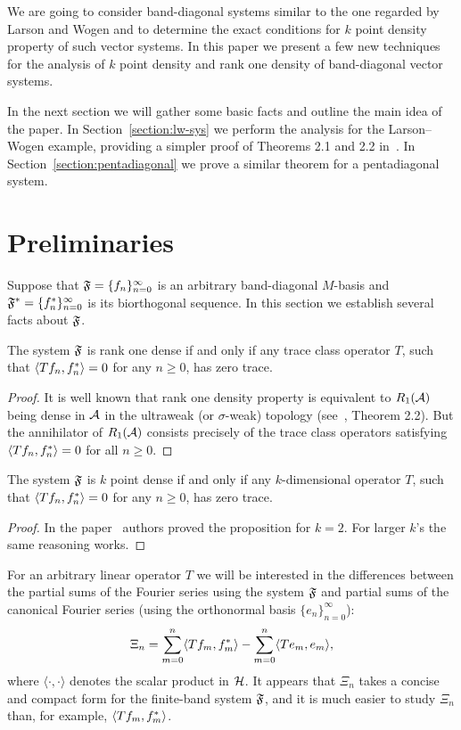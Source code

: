 \documentclass[12pt]{amsart}
\theoremstyle{case}
\begin{document}
    We are going to consider band-diagonal systems similar to the one regarded by Larson and Wogen and to determine the exact conditions
      for $k$ point density property of such vector systems.
    In this paper we present a few new techniques for the analysis of $k$ point density and rank one density of band-diagonal vector systems.

    In the next section we will gather some basic facts and outline the main idea of the paper.
    In Section~\ref{section:lw-sys} we perform the analysis for the Larson--Wogen example, providing a simpler proof of Theorems 2.1 and 2.2 in~\cite{katavolos}.
    In Section~\ref{section:pentadiagonal} we prove a similar theorem for a pentadiagonal system.
\section{Preliminaries}
  \label{sec:preliminaries}
  Suppose that $\fsys=\{f_n\}_{n=0}^\infty$ is an arbitrary band-diagonal $M$-basis and $\fstarsys = \{f^*_n\}_{n=0}^\infty$ is its biorthogonal sequence.
  In this section we establish several facts about $\fsys$.
  \begin{prop}
    The system $\fsys$ is rank one dense if and only if any trace class operator $T$,
      such that $\inner{Tf_n}{f_n^*} = 0$ for any $n \geq 0$, has  zero trace.
  \end{prop}
  \begin{proof}
    It is well known that rank one density property is equivalent to $R_1(\cal{A})$ being dense
      in $\cal{A}$ in the ultraweak (or $\sigma$-weak) topology (see~\cite{katavolos}, Theorem 2.2).
    But the annihilator of $R_1(\cal{A})$ consists precisely of the trace class operators satisfying
      $\inner{Tf_n}{f_n^*} = 0$ for all $n \geq 0$.
  \end{proof}
  \begin{prop}
    The system $\fsys$ is $k$ point dense if and only if any $k$-dimensional operator $T$,
      such that $\inner{Tf_n}{f_n^*} = 0$ for any $n \geq 0$, has  zero trace.
  \end{prop}
  \begin{proof}
    In the paper~\cite{katavolos} authors proved the proposition for $k = 2$.
    For larger $k$'s the same reasoning works.
  \end{proof}
  For an arbitrary linear operator $T$ we will be interested in the differences between
    the partial sums of the Fourier series using the system $\fsys$ and
    partial sums of the canonical Fourier series (using the orthonormal basis $\{e_n\}_{n=0}^\infty$):
  \begin{equation}
    \label{eq:xi}
    \Xi_n = \sum_{m=0}^n \inner{Tf_m}{f_m^*} - \sum_{m=0}^n \inner{Te_m}{e_m},
  \end{equation}
    where $\langle \cdot, \cdot\rangle$ denotes the scalar product in $\cal{H}$.
  It appears that $\Xi_n$ takes a concise and compact form for the finite-band system $\fsys$, and it is much easier to study $\Xi_n$
    than, for example, $\inner{Tf_m}{f_m^*}$.
\end{document}
